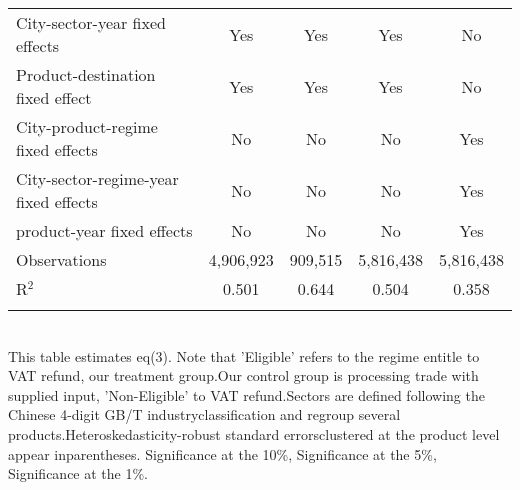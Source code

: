 \documentclass[preview]{standalone}
\begin{document}
\begin{table}[!htbp]
\begin{adjustbox}{width=\textwidth, totalheight=\baselineskip,keepaspectratio}
\begin{tabular}{@{\extracolsep{5pt}}lcccc}
City-sector-year fixed effects & Yes & Yes & Yes & No \\ 
Product-destination fixed effect & Yes & Yes & Yes & No \\ 
City-product-regime fixed effects & No & No & No & Yes \\ 
City-sector-regime-year fixed effects & No & No & No & Yes \\ 
product-year fixed effects & No & No & No & Yes \\ 
Observations & 4,906,923 & 909,515 & 5,816,438 & 5,816,438 \\ 
R$^{2}$ & 0.501 & 0.644 & 0.504 & 0.358 \\ 
\hline 
\hline \\[-1.8ex] 
\end{tabular}
\end{adjustbox}
\begin{tablenotes} 
 \small 
 \item \\ 
This table estimates eq(3). Note that 'Eligible' refers to the regime entitle to VAT refund, our treatment group.Our control group is processing trade with supplied input, 'Non-Eligible' to VAT refund.Sectors are defined following the Chinese 4-digit GB/T industryclassification and regroup several products.Heteroskedasticity-robust standard errorsclustered at the product level appear inparentheses.\sym{*} Significance at the 10\%, \sym{**} Significance at the 5\%, \sym{***} Significance at the 1\%. 
\end{tablenotes}
\end{table}
\end{document}
